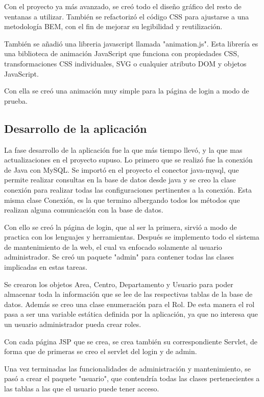 Con el proyecto ya más avanzado, se creó todo el diseño gráfico del resto de ventanas a utilizar. También se refactorizó el código CSS para ajustarse a una metodología BEM, con el fin de mejorar su legibilidad y reutilización.

También se añadió una libreria javascript llamada "animation.js". Esta librería es una biblioteca de animación JavaScript que funciona con propiedades CSS, transformaciones CSS individuales, SVG o cualquier atributo DOM y objetos JavaScript.

Con ella se creó una animación muy simple para la página de login a modo de prueba.


\subsection{Desarrollo de la aplicación}

La fase desarrollo de la aplicación fue la que más tiempo llevó, y la que mas actualizaciones en el proyecto supuso. Lo primero que se realizó fue la conexión de Java con MySQL. Se importó en el proyecto el conector java-mysql, que permite realizar consultas en la base de datos desde java y se creo la clase conexión para realizar todas las configuraciones pertinentes a la conexión. Esta misma clase Conexión, es la que termino albergando todos los métodos  que realizan alguna comunicación con la base de datos.

Con ello se creó la página de login, que al ser la primera, sirvió a modo de practica con los lenguajes y herramientas. Después se implemento todo el sistema de mantenimiento de la web, el cual va enfocado solamente al usuario administrador. Se creó un paquete "admin" para contener todas las clases implicadas en estas tareas. 

Se crearon los objetos Area, Centro, Departamento y Usuario para poder almacenar toda la información que se lee de las respectivas tablas de la base de datos. Además se creo una clase enumeración para el Rol. De esta manera el rol pasa a ser una variable estática definida por la aplicación, ya que no interesa que un usuario administrador pueda crear roles.

Con cada página JSP que se crea, se crea también su correspondiente Servlet, de forma que de primeras se creo el servlet del login y de admin.

Una vez terminadas las funcionalidades de administración y mantenimiento,  se pasó a crear el paquete "usuario", que contendría todas las clases pertenecientes a las tablas a las que el usuario puede tener acceso.

